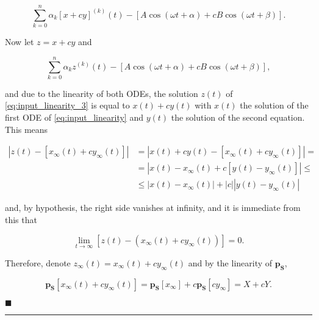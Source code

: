\begin{equation} \sum\limits_{k=0}^n \alpha_k \left[x + cy\right]^{(k)}(t) - \left[ A\cos\left(\omega t + \alpha\right) + c B\cos\left(\omega t + \beta\right)\right] . \label{eq:input_linearity_2}\end{equation}

	Now let $z = x + cy$ and

\begin{equation} \sum\limits_{k=0}^n \alpha_k z^{(k)}(t) - \left[ A\cos\left(\omega t + \alpha\right) + c B\cos\left(\omega t + \beta\right)\right] , \label{eq:input_linearity_3}\end{equation}

	\noindent and due to the linearity of both ODEs, the solution $z(t)$ of \eqref{eq:input_linearity_3} is equal to $x(t) + cy(t)$ with $x(t)$ the solution of the first ODE of \eqref{eq:input_linearity}  and $y(t)$ the solution of the second equation. This means

\begin{align}
	\left\lvert z(t) - \left[x_\infty(t) + cy_\infty(t)\right]\right\rvert &= \left\lvert x(t) + cy(t) - \left[x_\infty(t) + cy_\infty(t)\right]\right\rvert = \nonumber\\[3mm] &= \left\lvert x(t) - x_\infty(t) + c\left[y(t) - y_\infty(t)\right]\right\rvert \leq \nonumber\\[3mm] &\leq \left\lvert x(t) - x_\infty(t)\right\rvert + \left\lvert c \right\rvert\left\lvert y(t) - y_\infty(t)\right\rvert
\end{align}

	\noindent and, by hypothesis, the right side vanishes at infinity, and it is immediate from this that

\begin{equation} \lim_{t\to\infty} \left[z(t) - \left(x_\infty(t) + cy_\infty(t)\right)\right] = 0 .\end{equation}

	Therefore, denote $z_\infty(t) = x_\infty(t) + cy_\infty(t)$ and by the linearity of $\mathbf{p_S}$,

\begin{equation} \mathbf{p_S}\left[x_\infty(t) + cy_\infty(t)\right] = \mathbf{p_S}\left[x_\infty\right] + c\mathbf{p_S}\left[cy_\infty\right] = X + cY.\end{equation}


\hfill$\blacksquare$
\vspace{5mm}
\hrule
\vspace{5mm}

